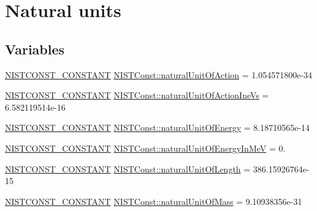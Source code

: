 \hypertarget{group___n_i_s_t_const-_natural_unit}{}\section{Natural units}
\label{group___n_i_s_t_const-_natural_unit}
\subsection*{Variables}
\begin{DoxyCompactItemize}
\item 
\mbox{\hyperlink{_n_i_s_t_const_8hpp_a2b0fc1d7452373f816175dd86ce26729}{N\+I\+S\+T\+C\+O\+N\+S\+T\+\_\+\+C\+O\+N\+S\+T\+A\+NT}} \mbox{\hyperlink{group___n_i_s_t_const-_natural_unit_ga52ce10be6f28a0403e43f42445dd5bdb}{N\+I\+S\+T\+Const\+::natural\+Unit\+Of\+Action}} = 1.\+054571800e-\/34
\item 
\mbox{\hyperlink{_n_i_s_t_const_8hpp_a2b0fc1d7452373f816175dd86ce26729}{N\+I\+S\+T\+C\+O\+N\+S\+T\+\_\+\+C\+O\+N\+S\+T\+A\+NT}} \mbox{\hyperlink{group___n_i_s_t_const-_natural_unit_gadf0b7bf18e0371c6528e8532ae1b9984}{N\+I\+S\+T\+Const\+::natural\+Unit\+Of\+Action\+Ine\+Vs}} = 6.\+582119514e-\/16
\item 
\mbox{\hyperlink{_n_i_s_t_const_8hpp_a2b0fc1d7452373f816175dd86ce26729}{N\+I\+S\+T\+C\+O\+N\+S\+T\+\_\+\+C\+O\+N\+S\+T\+A\+NT}} \mbox{\hyperlink{group___n_i_s_t_const-_natural_unit_gafbdfe6f0b94bdc194fcb719c7a09ad01}{N\+I\+S\+T\+Const\+::natural\+Unit\+Of\+Energy}} = 8.\+18710565e-\/14
\item 
\mbox{\hyperlink{_n_i_s_t_const_8hpp_a2b0fc1d7452373f816175dd86ce26729}{N\+I\+S\+T\+C\+O\+N\+S\+T\+\_\+\+C\+O\+N\+S\+T\+A\+NT}} \mbox{\hyperlink{group___n_i_s_t_const-_natural_unit_gae7af288f55f49ca09dae5a25f69941c6}{N\+I\+S\+T\+Const\+::natural\+Unit\+Of\+Energy\+In\+MeV}} = 0.
\item 
\mbox{\hyperlink{_n_i_s_t_const_8hpp_a2b0fc1d7452373f816175dd86ce26729}{N\+I\+S\+T\+C\+O\+N\+S\+T\+\_\+\+C\+O\+N\+S\+T\+A\+NT}} \mbox{\hyperlink{group___n_i_s_t_const-_natural_unit_ga746fb3dd81ed728c99e5f78ccbc3c15f}{N\+I\+S\+T\+Const\+::natural\+Unit\+Of\+Length}} = 386.\+15926764e-\/15
\item 
\mbox{\hyperlink{_n_i_s_t_const_8hpp_a2b0fc1d7452373f816175dd86ce26729}{N\+I\+S\+T\+C\+O\+N\+S\+T\+\_\+\+C\+O\+N\+S\+T\+A\+NT}} \mbox{\hyperlink{group___n_i_s_t_const-_natural_unit_gaf95361f1122cce12b7ad6fa77e75bcd5}{N\+I\+S\+T\+Const\+::natural\+Unit\+Of\+Mass}} = 9.\+10938356e-\/31
\item 

\end{DoxyCompactItemize}
